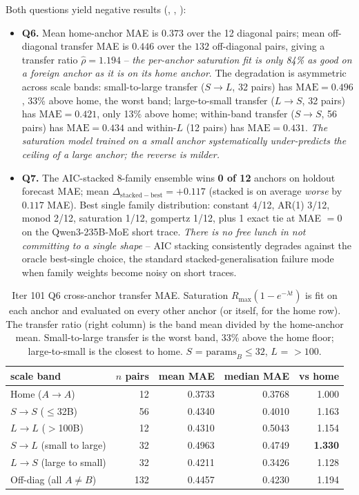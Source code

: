 Both questions yield negative results
(,
,
):

\begin{itemize}
\item \textbf{Q6.}  Mean home-anchor MAE is $0.373$ over the 12
diagonal pairs; mean off-diagonal transfer MAE is $0.446$ over the
$132$ off-diagonal pairs, giving a transfer ratio
$\hat\rho = 1.194$ -- \emph{the per-anchor saturation fit is only 84\%
as good on a foreign anchor as it is on its home anchor}.  The
degradation is asymmetric across scale bands: small-to-large transfer
($S \to L$, 32 pairs) has $\mathrm{MAE} = 0.496$, 33\% above home, the
worst band; large-to-small transfer ($L \to S$, 32 pairs) has
$\mathrm{MAE} = 0.421$, only 13\% above home; within-band transfer
($S \to S$, 56 pairs) has $\mathrm{MAE} = 0.434$ and within-$L$
(12 pairs) has $\mathrm{MAE} = 0.431$.  \emph{The saturation model
trained on a small anchor systematically under-predicts the ceiling of
a large anchor; the reverse is milder.}
\item \textbf{Q7.}  The AIC-stacked 8-family ensemble wins
\textbf{0 of 12} anchors on holdout forecast MAE; mean
$\Delta_\mathrm{stacked-best} = +0.117$ (stacked is on average
\emph{worse} by $0.117$ MAE).  Best single family distribution:
constant 4/12, AR(1) 3/12, monod 2/12, saturation 1/12, gompertz 1/12,
plus 1 exact tie at MAE $=0$ on the Qwen3-235B-MoE short trace.
\emph{There is no free lunch in not committing to a single shape} --
AIC stacking consistently degrades against the oracle best-single
choice, the standard stacked-generalisation failure mode when family
weights become noisy on short traces.
\end{itemize}

\begin{table}[htbp]
\centering
\small
\begin{tabular}{lrrrr}
\hline
scale band & $n$ pairs & mean MAE & median MAE & vs home \\
\hline
Home ($A \to A$)            & 12  & 0.3733 & 0.3768 & 1.000 \\
$S \to S$ ($\le$32B)         & 56  & 0.4340 & 0.4010 & 1.163 \\
$L \to L$ ($>$100B)          & 12  & 0.4310 & 0.5043 & 1.154 \\
$S \to L$ (small to large)   & 32  & 0.4963 & 0.4749 & \textbf{1.330} \\
$L \to S$ (large to small)   & 32  & 0.4211 & 0.3426 & 1.128 \\
\hline
Off-diag (all $A \ne B$)     & 132 & 0.4457 & 0.4230 & 1.194 \\
\hline
\end{tabular}
\caption{Iter 101 Q6 cross-anchor transfer MAE.  Saturation
$R_\mathrm{max} (1 - e^{-\lambda t})$ is fit on each anchor and
evaluated on every other anchor (or itself, for the home row).  The
transfer ratio (right column) is the band mean divided by the
home-anchor mean.  Small-to-large transfer is the worst band, 33\%
above the home floor; large-to-small is the closest to home.  $S$ =
$\mathrm{params}_B \le 32$, $L$ = $> 100$.}
\label{tab:scaling-iter101-transfer}
\end{table}

